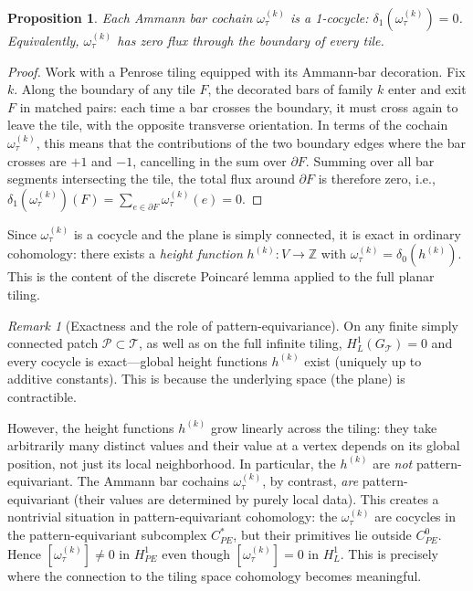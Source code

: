 \documentclass[12pt]{article}
\newtheorem{proposition}[theorem]{Proposition}
\theoremstyle{definition}
\theoremstyle{remark}
\newtheorem{remark}[theorem]{Remark}
\newcommand{\ZZ}{\mathbb{Z}}
\begin{document}
\begin{proposition}
\label{prop:cocycle}
Each Ammann bar cochain $\omega_\tau^{(k)}$ is a 1-cocycle: $\delta_1(\omega_\tau^{(k)}) = 0$. Equivalently, $\omega_\tau^{(k)}$ has zero flux through the boundary of every tile.
\end{proposition}

\begin{proof}
Work with a Penrose tiling equipped with its Ammann-bar decoration. Fix $k$. Along the boundary of any tile $F$, the decorated bars of family $k$ enter and exit $F$ in matched pairs: each time a bar crosses the boundary, it must cross again to leave the tile, with the opposite transverse orientation. In terms of the cochain $\omega_\tau^{(k)}$, this means that the contributions of the two boundary edges where the bar crosses are $+1$ and $-1$, cancelling in the sum over $\partial F$. Summing over all bar segments intersecting the tile, the total flux around $\partial F$ is therefore zero, i.e., $\delta_1(\omega_\tau^{(k)})(F) = \sum_{e\in\partial F}\omega_\tau^{(k)}(e)=0$.
\end{proof}

Since $\omega_\tau^{(k)}$ is a cocycle and the plane is simply connected, it is exact in ordinary cohomology: there exists a \emph{height function} $h^{(k)}: V \to \ZZ$ with $\omega_\tau^{(k)} = \delta_0(h^{(k)})$. This is the content of the discrete Poincar\'{e} lemma applied to the full planar tiling.

\begin{remark}[Exactness and the role of pattern-equivariance]
\label{rem:exactness-PE}
On any finite simply connected patch $\mathcal{P} \subset \mathcal{T}$, as well as on the full infinite tiling, $H^1_L(G_{\mathcal{T}}) = 0$ and every cocycle is exact---global height functions $h^{(k)}$ exist (uniquely up to additive constants). This is because the underlying space (the plane) is contractible.

However, the height functions $h^{(k)}$ grow linearly across the tiling: they take arbitrarily many distinct values and their value at a vertex depends on its global position, not just its local neighborhood. In particular, the $h^{(k)}$ are \emph{not} pattern-equivariant. The Ammann bar cochains $\omega_\tau^{(k)}$, by contrast, \emph{are} pattern-equivariant (their values are determined by purely local data). This creates a nontrivial situation in pattern-equivariant cohomology: the $\omega_\tau^{(k)}$ are cocycles in the pattern-equivariant subcomplex $C^*_{PE}$, but their primitives lie outside $C^0_{PE}$. Hence $[\omega_\tau^{(k)}] \neq 0$ in $H^1_{PE}$ even though $[\omega_\tau^{(k)}] = 0$ in $H^1_L$. This is precisely where the connection to the tiling space cohomology becomes meaningful.
\end{remark}
\end{document}
